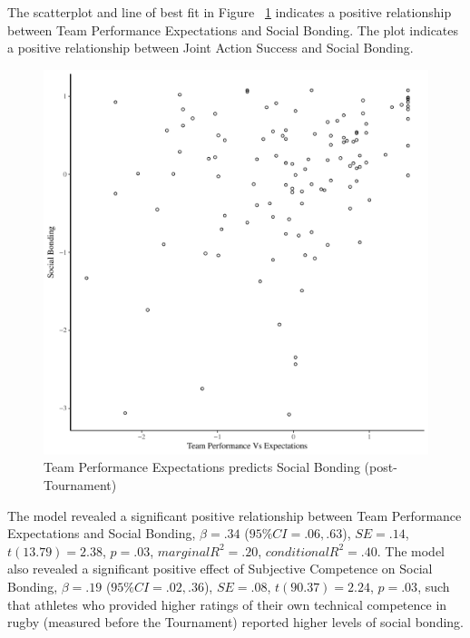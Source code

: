 The scatterplot and line of best fit in Figure ~\ref{fig:teamPerfBondBasicXY} indicates a positive relationship between Team Performance Expectations and Social Bonding. The plot indicates a positive relationship between Joint Action Success and Social Bonding.

  \begin{figure}[htbp]
    \centering
  \includegraphics[scale=.5]{images/teamPerfBondBasicXY.pdf}
    \caption{Team Performance Expectations predicts Social Bonding (post-Tournament)}
    \label{fig:teamPerfBondBasicXY}
  \end{figure}

The model revealed a significant positive relationship between Team Performance Expectations and Social Bonding, $\beta = .34$ ($95\% CI =  .06, .63$), $SE = .14$, $t(13.79) = 2.38$, $p = .03$, $marginal R^2 = .20$, $conditional R^2 = .40$.  The model also revealed a significant positive effect of Subjective Competence on Social Bonding, $\beta = .19$ ($95\% CI =  .02, .36$), $SE = .08$, $t(90.37) = 2.24$, $p = .03$, such that athletes who provided higher ratings of their own technical competence in rugby (measured before the Tournament) reported higher levels of social bonding.


